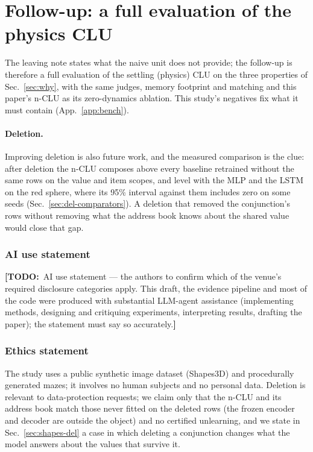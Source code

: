 \documentclass{article} %
\newcommand{\TODO}[1]{{\color{orange}\textbf{[TODO:}~#1\textbf{]}}}
\begin{document}
\section{Follow-up: a full evaluation of the physics CLU}
\label{sec:followup}

The leaving note states what the naive unit does not provide; the follow-up is therefore a full evaluation of the settling (physics) CLU on the three properties of Sec.~\ref{sec:why}, with the same judges, memory footprint and matching and this paper's n-CLU as its zero-dynamics ablation. This study's negatives fix what it must contain (App.~\ref{app:bench}).

\paragraph{Deletion.} Improving deletion is also future work, and the measured comparison is
the clue: after deletion the n-CLU composes above every baseline retrained without the same rows on
the value and item scopes, and level with the MLP and the LSTM on the red sphere, where its 95\% %
interval against them includes zero on some seeds (Sec.~\ref{sec:del-comparators}). A deletion that
removed the conjunction's rows without removing what the address book knows about the shared value
would close that gap.

\subsubsection*{AI use statement}
\TODO{AI use statement --- the authors to confirm which of the venue's required disclosure categories
apply. This draft, the evidence pipeline and most of the code were produced with substantial LLM-agent
assistance (implementing methods, designing and critiquing experiments, interpreting results,
drafting the paper); the statement must say so accurately.}

\subsubsection*{Ethics statement}
The study uses a public synthetic image dataset (Shapes3D) and procedurally generated mazes; it
involves no human subjects and no personal data. Deletion is relevant to data-protection
requests; we claim only that the n-CLU and its address book match those never fitted on the deleted
rows (the frozen encoder and decoder are outside the object) and no certified unlearning, and
we state in Sec.~\ref{sec:shapes-del} a case in which deleting a conjunction changes what the
model answers about the values that survive it.
\end{document}

